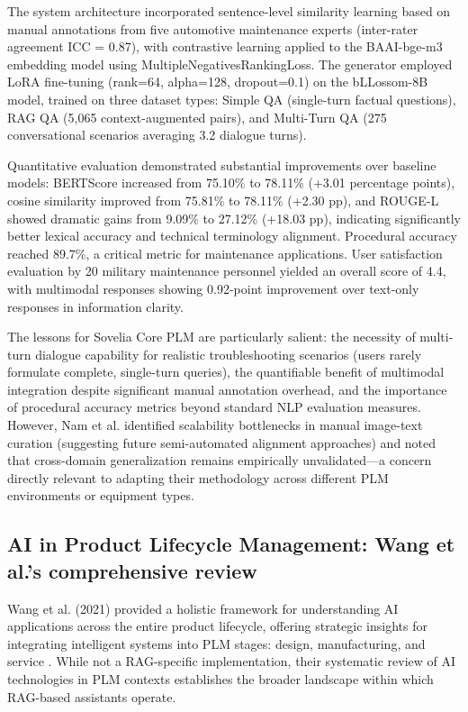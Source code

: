 The system architecture incorporated sentence-level similarity learning based on manual annotations from five automotive maintenance experts (inter-rater agreement ICC = 0.87), with contrastive learning applied to the BAAI-bge-m3 embedding model using MultipleNegativesRankingLoss. The generator employed LoRA fine-tuning (rank=64, alpha=128, dropout=0.1) on the bLLossom-8B model, trained on three dataset types: Simple QA (single-turn factual questions), RAG QA (5,065 context-augmented pairs), and Multi-Turn QA (275 conversational scenarios averaging 3.2 dialogue turns).

Quantitative evaluation demonstrated substantial improvements over baseline models: BERTScore increased from 75.10\% to 78.11\% (+3.01 percentage points), cosine similarity improved from 75.81\% to 78.11\% (+2.30 pp), and ROUGE-L showed dramatic gains from 9.09\% to 27.12\% (+18.03 pp), indicating significantly better lexical accuracy and technical terminology alignment. Procedural accuracy reached 89.7\%, a critical metric for maintenance applications. User satisfaction evaluation by 20 military maintenance personnel yielded an overall score of 4.4, with multimodal responses showing 0.92-point improvement over text-only responses in information clarity.

The lessons for Sovelia Core PLM are particularly salient: the necessity of multi-turn dialogue capability for realistic troubleshooting scenarios (users rarely formulate complete, single-turn queries), the quantifiable benefit of multimodal integration despite significant manual annotation overhead, and the importance of procedural accuracy metrics beyond standard NLP evaluation measures. However, Nam et al. identified scalability bottlenecks in manual image-text curation (suggesting future semi-automated alignment approaches) and noted that cross-domain generalization remains empirically unvalidated—a concern directly relevant to adapting their methodology across different PLM environments or equipment types.

\subsection{AI in Product Lifecycle Management: Wang et al.'s comprehensive review}

Wang et al. (2021) provided a holistic framework for understanding AI applications across the entire product lifecycle, offering strategic insights for integrating intelligent systems into PLM stages: design, manufacturing, and service \parencite{wang_artificial_2021}. While not a RAG-specific implementation, their systematic review of AI technologies in PLM contexts establishes the broader landscape within which RAG-based assistants operate.

